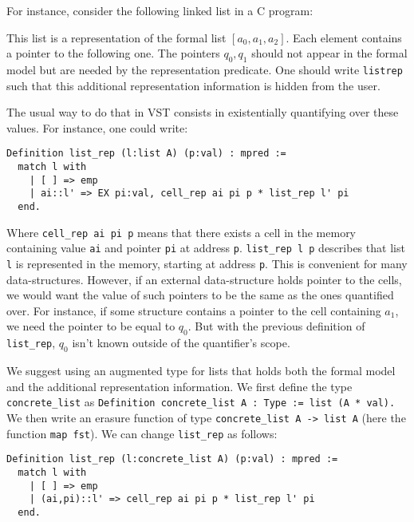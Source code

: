 For instance, consider the following linked list in a C program:

\begin{center}
\end{center}

This list is a representation of the formal list $[a_0,a_1,a_2]$.
Each element contains a pointer to the following one.
The pointers $q_0, q_1$ should not appear in the formal model but are needed by the representation predicate.
One should write \lstinline{listrep} such that this additional representation information is hidden from the user.

The usual way to do that in VST consists in existentially quantifying over these values.
For instance, one could write:
\begin{lstlisting}[language=Coq]
Definition list_rep (l:list A) (p:val) : mpred :=
  match l with
    | [ ] => emp
    | ai::l' => EX pi:val, cell_rep ai pi p * list_rep l' pi
  end.
\end{lstlisting}

Where \lstinline{cell_rep ai pi p} means that there exists a cell in the memory containing value \texttt{ai} and pointer \texttt{pi} at address \texttt{p}.
\lstinline{list_rep l p} describes that list \texttt{l} is represented in the memory, starting at address \texttt{p}. This is convenient for many data-structures.
However, if an external data-structure holds pointer to the cells, we would want the value of such pointers to be the same as the ones quantified over.
For instance, if some structure contains a pointer to the cell containing $a_1$, we need the pointer to be equal to $q_0$.
But with the previous definition of \lstinline{list_rep}, $q_0$ isn't known outside of the quantifier's scope.

We suggest using an augmented type for lists that holds both the formal model and the additional representation information.
We first define the type \lstinline{concrete_list} as
\lstinline[language=Coq]{Definition concrete_list A : Type := list (A * val).}
We then write an erasure function of type \lstinline[language=Coq]{concrete_list A -> list A} (here the function \lstinline[language=Coq]{map fst}).
We can change \lstinline[language=Coq]{list_rep} as follows:
\begin{lstlisting}[language=Coq]
Definition list_rep (l:concrete_list A) (p:val) : mpred :=
  match l with
    | [ ] => emp
    | (ai,pi)::l' => cell_rep ai pi p * list_rep l' pi
  end.
\end{lstlisting}

